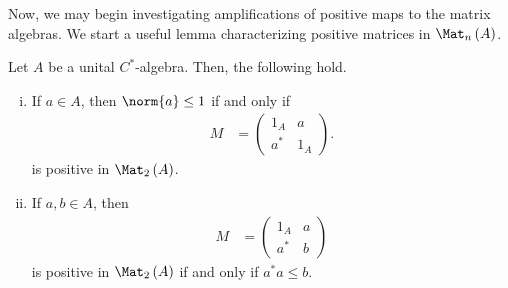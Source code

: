 Now, we may begin investigating amplifications of positive maps to the matrix algebras. We start a useful lemma characterizing positive matrices in $\Mat_n\left( A \right)$.
\begin{lemma}\label{lemma:positive_elements_from_matrix_algebras}
  Let $A$ be a unital $C^{\ast}$-algebra. Then, the following hold.
  \begin{enumerate}[(i)]
    \item If $a\in A$, then $\norm{a}\leq 1$ if and only if
      \begin{align*}
        M &= \begin{pmatrix}1_A & a\\a^{\ast} & 1_A\end{pmatrix}.
      \end{align*}
      is positive in $\Mat_2\left( A \right)$.
    \item If $a,b\in A$, then 
      \begin{align*}
        M &= \begin{pmatrix}1_A & a \\ a^{\ast} & b\end{pmatrix}
      \end{align*}
      is positive in $\Mat_2\left( A \right)$ if and only if $a^{\ast}a \leq b$.
  \end{enumerate}
\end{lemma}
